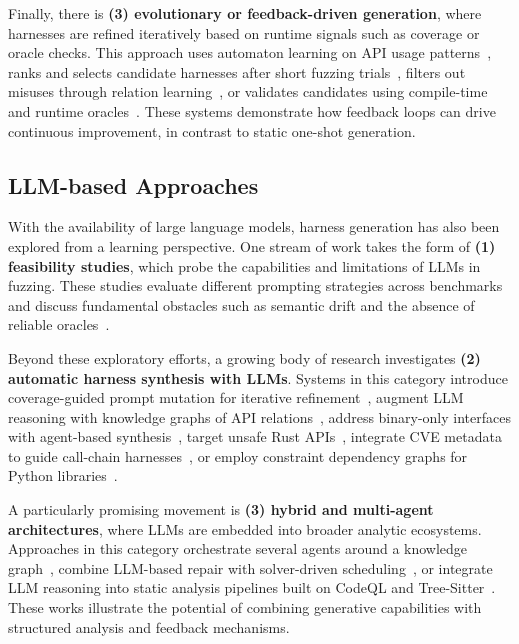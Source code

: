 Finally, there is \textbf{(3) evolutionary or feedback-driven generation}, where harnesses are refined iteratively based on runtime signals such as coverage or oracle checks. This approach uses automaton learning on API usage patterns~\cite{DBLP:conf/uss/ZhangLZZZZXLL0H23:Rubick}, ranks and selects candidate harnesses after short fuzzing trials~\cite{DBLP:journals/pacmse/ToffaliniBTP25:LibErator}, filters out misuses through relation learning~\cite{DBLP:conf/ndss/0007ZLSZLQ25:NEXZZER}, or validates candidates using compile-time and runtime oracles~\cite{DBLP:conf/icse/ShermanN25:OGHarn}. These systems demonstrate how feedback loops can drive continuous improvement, in contrast to static one-shot generation.

\subsection{LLM-based Approaches}
\label{subsec:llm-approaches}


With the availability of large language models, harness generation has also been explored from a learning perspective. One stream of work takes the form of \textbf{(1) feasibility studies}, which probe the capabilities and limitations of LLMs in fuzzing. These studies evaluate different prompting strategies across benchmarks~\cite{DBLP:conf/issta/ZhangZBLMXLSL24:HowEffectiveAreThey} and discuss fundamental obstacles such as semantic drift and the absence of reliable oracles~\cite{DBLP:conf/sigsoft/Jiang0MCZSWFWLZ24:WhenFuzzingMeetsLLMs}.

Beyond these exploratory efforts, a growing body of research investigates \textbf{(2) automatic harness synthesis with LLMs}. Systems in this category introduce coverage-guided prompt mutation for iterative refinement~\cite{DBLP:conf/ccs/LyuXCC24:PromptFuzz}, augment LLM reasoning with knowledge graphs of API relations~\cite{DBLP:conf/icse/XuMZZCHLW25:CKGFuzzer}, address binary-only interfaces with agent-based synthesis~\cite{DBLP:journals/corr/abs-2507-15058:LibLMFuzz}, target unsafe Rust APIs~\cite{DBLP:journals/corr/abs-2506-15648:deepSURF}, integrate CVE metadata to guide call-chain harnesses~\cite{DBLP:journals/corr/abs-2505-03425:HGFuzzer}, or employ constraint dependency graphs for Python libraries~\cite{DBLP:journals/cybersec/LiuLZZLL25:LLM4TDG}.

A particularly promising movement is \textbf{(3) hybrid and multi-agent architectures}, where LLMs are embedded into broader analytic ecosystems. Approaches in this category orchestrate several agents around a knowledge graph~\cite{DBLP:conf/icse/XuMZZCHLW25:CKGFuzzer}, combine LLM-based repair with solver-driven scheduling~\cite{DBLP:journals/corr/abs-2507-18289:Scheduzz}, or integrate LLM reasoning into static analysis pipelines built on CodeQL and Tree-Sitter~\cite{DBLP:journals/corr/abs-2505-03425:HGFuzzer}. These works illustrate the potential of combining generative capabilities with structured analysis and feedback mechanisms.

